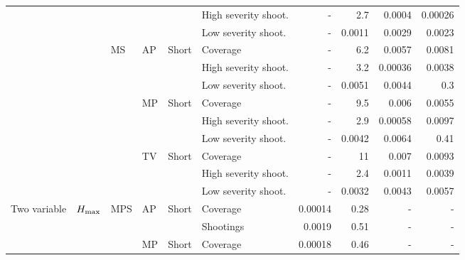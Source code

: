 \documentclass[article]{standalone}
\begin{document}
\begin{tabular}{llllllrrrr}
             &                   &    &    &       & High severity shoot. &                    - &       2.7 &               0.0004 &               0.00026 \\
             &                   &    &    &       & Low severity shoot. &                    - &    0.0011 &               0.0029 &                0.0023 \\
             &                   & MS & AP & Short & Coverage &                    - &       6.2 &               0.0057 &                0.0081 \\
             &                   &    &    &       & High severity shoot. &                    - &       3.2 &              0.00036 &                0.0038 \\
             &                   &    &    &       & Low severity shoot. &                    - &    0.0051 &               0.0044 &                   0.3 \\
             &                   &    & MP & Short & Coverage &                    - &       9.5 &                0.006 &                0.0055 \\
             &                   &    &    &       & High severity shoot. &                    - &       2.9 &              0.00058 &                0.0097 \\
             &                   &    &    &       & Low severity shoot. &                    - &    0.0042 &               0.0064 &                  0.41 \\
             &                   &    & TV & Short & Coverage &                    - &        11 &                0.007 &                0.0093 \\
             &                   &    &    &       & High severity shoot. &                    - &       2.4 &               0.0011 &                0.0039 \\
             &                   &    &    &       & Low severity shoot. &                    - &    0.0032 &               0.0043 &                0.0057 \\
Two variable & $H_{\rm{max}}$ & MPS & AP & Short & Coverage &              0.00014 &      0.28 &                    - &                     - \\
             &                   &    &    &       & Shootings &               0.0019 &      0.51 &                    - &                     - \\
             &                   &    & MP & Short & Coverage &              0.00018 &      0.46 &                    - &                     - \\

\end{tabular}
\end{document}
